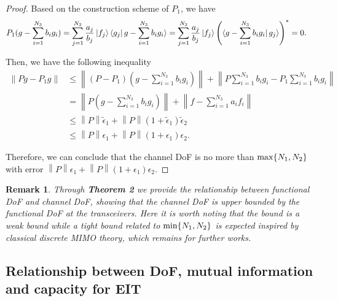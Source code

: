 \documentclass[12pt,draftclsnofoot,journal,onecolumn]{IEEEtran}
\newtheorem{remark}{Remark}
\begin{document}
\begin{proof}
		Based on the construction scheme of $P_1$, we have 
		\begin{equation}
			\begin{aligned}
				P_1 (g-\sum_{i=1}^{N_3}b_ig_i ) &= \sum_{j=1}^{N_3}\frac{a_j}{b_j} \ket{f_j} \bra{g_j} g-\sum_{i=1}^{N_3}b_ig_i \rangle
				 = \sum_{j=1}^{N_3}\frac{a_j}{b_j} \ket{f_j} \left(\bra{g-\sum_{i=1}^{N_3}b_ig_i} g_j \rangle \right)^* = 0.
			\end{aligned}
		\end{equation}
		
		Then, we have the following inequality
		\begin{equation}
			\begin{aligned}
				\left\|  Pg - P_1 g  \right\| &\leqslant \left\| (P-P_1)(g-\sum_{i=1}^{N_3}b_ig_i)  \right\|  + \left\| P\sum_{i=1}^{N_3}b_ig_i -P_1\sum_{i=1}^{N_3}b_ig_i  \right\|
				\\&= \left\| P(g-\sum_{i=1}^{N_3}b_ig_i)  \right\|  + \left\| f - \sum_{i=1}^{N_3} a_i f_i \right\|
				\\& \leqslant \left\| P \right\| \tilde{\epsilon}_1 + \left\|  P \right\| (1+\tilde{\epsilon}_1) \tilde{\epsilon}_2
				\\&\leqslant \left\| P \right\| \epsilon_1 + \left\|  P \right\| (1+\epsilon_1) \epsilon_2.
			\end{aligned}
		\end{equation}
		
			Therefore, we can conclude that the channel DoF is no more than ${\rm max}\{N_1,N_2\}$ with error $\left\| P \right\| \epsilon_1 + \left\|  P \right\| (1+\epsilon_1) \epsilon_2$.
	\end{proof}
	
	\begin{remark}
		Through {\bf Theorem 2} we provide the relationship between functional DoF and channel DoF, showing that the channel DoF is upper bounded by the functional DoF at the transceivers. Here it is worth noting that the bound is a weak bound while a tight bound related to ${\rm min}\{N_1,N_2\}$ is expected inspired by classical discrete MIMO theory, which remains for further works.
	\end{remark}

	{\color{red}\subsection{Relationship between DoF, mutual information and capacity for EIT}}
	
\end{document}
